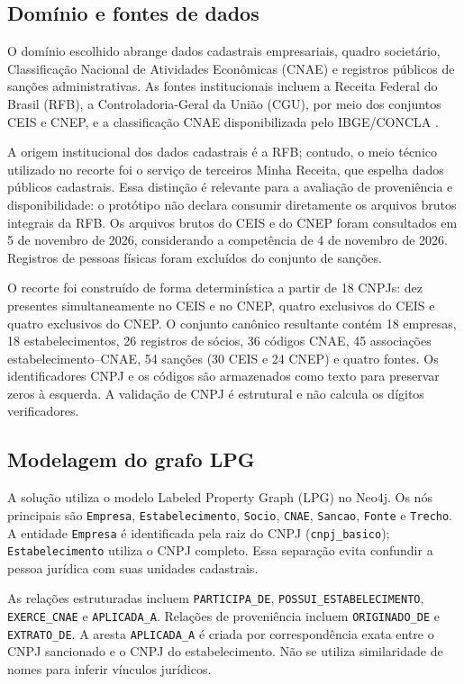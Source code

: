\documentclass[12pt]{article}
\begin{document}
\subsection{Domínio e fontes de dados}

O domínio escolhido abrange dados cadastrais empresariais, quadro societário, Classificação Nacional de Atividades Econômicas (CNAE) e registros públicos de sanções administrativas. As fontes institucionais incluem a Receita Federal do Brasil (RFB), a Controladoria-Geral da União (CGU), por meio dos conjuntos CEIS e CNEP, e a classificação CNAE disponibilizada pelo IBGE/CONCLA \cite{rfb2026,cguceis2026,cgucnep2026,ibge2026}.

A origem institucional dos dados cadastrais é a RFB; contudo, o meio técnico utilizado no recorte foi o serviço de terceiros Minha Receita, que espelha dados públicos cadastrais. Essa distinção é relevante para a avaliação de proveniência e disponibilidade: o protótipo não declara consumir diretamente os arquivos brutos integrais da RFB. Os arquivos brutos do CEIS e do CNEP foram consultados em 5 de novembro de 2026, considerando a competência de 4 de novembro de 2026. Registros de pessoas físicas foram excluídos do conjunto de sanções.

O recorte foi construído de forma determinística a partir de 18 CNPJs: dez presentes simultaneamente no CEIS e no CNEP, quatro exclusivos do CEIS e quatro exclusivos do CNEP. O conjunto canônico resultante contém 18 empresas, 18 estabelecimentos, 26 registros de sócios, 36 códigos CNAE, 45 associações estabelecimento--CNAE, 54 sanções (30 CEIS e 24 CNEP) e quatro fontes. Os identificadores CNPJ e os códigos são armazenados como texto para preservar zeros à esquerda. A validação de CNPJ é estrutural e não calcula os dígitos verificadores.

\subsection{Modelagem do grafo LPG}

A solução utiliza o modelo Labeled Property Graph (LPG) no Neo4j. Os nós principais são \texttt{Empresa}, \texttt{Estabelecimento}, \texttt{Socio}, \texttt{CNAE}, \texttt{Sancao}, \texttt{Fonte} e \texttt{Trecho}. A entidade \texttt{Empresa} é identificada pela raiz do CNPJ (\texttt{cnpj\_basico}); \texttt{Estabelecimento} utiliza o CNPJ completo. Essa separação evita confundir a pessoa jurídica com suas unidades cadastrais.

As relações estruturadas incluem \texttt{PARTICIPA\_DE}, \texttt{POSSUI\_ESTABELECIMENTO}, \texttt{EXERCE\_CNAE} e \texttt{APLICADA\_A}. Relações de proveniência incluem \texttt{ORIGINADO\_DE} e \texttt{EXTRATO\_DE}. A aresta \texttt{APLICADA\_A} é criada por correspondência exata entre o CNPJ sancionado e o CNPJ do estabelecimento. Não se utiliza similaridade de nomes para inferir vínculos jurídicos.
\end{document}

